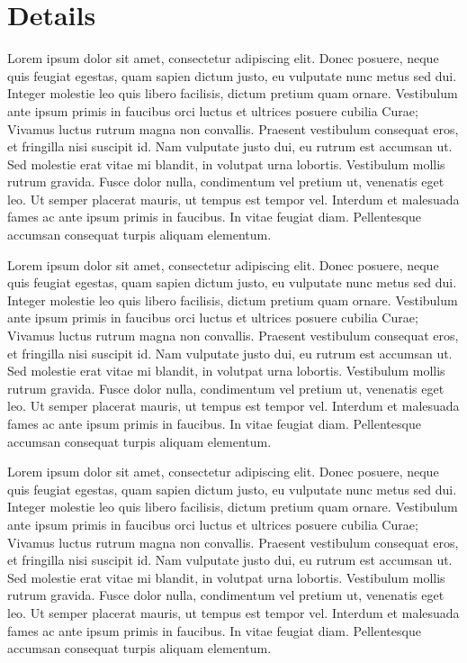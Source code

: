 \chapter{Details}

Lorem ipsum dolor sit amet, consectetur adipiscing elit. Donec posuere, neque quis feugiat egestas, quam sapien dictum justo, eu vulputate nunc metus sed dui. Integer molestie leo quis libero facilisis, dictum pretium quam ornare. Vestibulum ante ipsum primis in faucibus orci luctus et ultrices posuere cubilia Curae; Vivamus luctus rutrum magna non convallis. Praesent vestibulum consequat eros, et fringilla nisi suscipit id. Nam vulputate justo dui, eu rutrum est accumsan ut. Sed molestie erat vitae mi blandit, in volutpat urna lobortis. Vestibulum mollis rutrum gravida. Fusce dolor nulla, condimentum vel pretium ut, venenatis eget leo. Ut semper placerat mauris, ut tempus est tempor vel. Interdum et malesuada fames ac ante ipsum primis in faucibus. In vitae feugiat diam. Pellentesque accumsan consequat turpis aliquam elementum.

Lorem ipsum dolor sit amet, consectetur adipiscing elit. Donec posuere, neque quis feugiat egestas, quam sapien dictum justo, eu vulputate nunc metus sed dui. Integer molestie leo quis libero facilisis, dictum pretium quam ornare. Vestibulum ante ipsum primis in faucibus orci luctus et ultrices posuere cubilia Curae; Vivamus luctus rutrum magna non convallis. Praesent vestibulum consequat eros, et fringilla nisi suscipit id. Nam vulputate justo dui, eu rutrum est accumsan ut. Sed molestie erat vitae mi blandit, in volutpat urna lobortis. Vestibulum mollis rutrum gravida. Fusce dolor nulla, condimentum vel pretium ut, venenatis eget leo. Ut semper placerat mauris, ut tempus est tempor vel. Interdum et malesuada fames ac ante ipsum primis in faucibus. In vitae feugiat diam. Pellentesque accumsan consequat turpis aliquam elementum.

Lorem ipsum dolor sit amet, consectetur adipiscing elit. Donec posuere, neque quis feugiat egestas, quam sapien dictum justo, eu vulputate nunc metus sed dui. Integer molestie leo quis libero facilisis, dictum pretium quam ornare. Vestibulum ante ipsum primis in faucibus orci luctus et ultrices posuere cubilia Curae; Vivamus luctus rutrum magna non convallis. Praesent vestibulum consequat eros, et fringilla nisi suscipit id. Nam vulputate justo dui, eu rutrum est accumsan ut. Sed molestie erat vitae mi blandit, in volutpat urna lobortis. Vestibulum mollis rutrum gravida. Fusce dolor nulla, condimentum vel pretium ut, venenatis eget leo. Ut semper placerat mauris, ut tempus est tempor vel. Interdum et malesuada fames ac ante ipsum primis in faucibus. In vitae feugiat diam. Pellentesque accumsan consequat turpis aliquam elementum.

